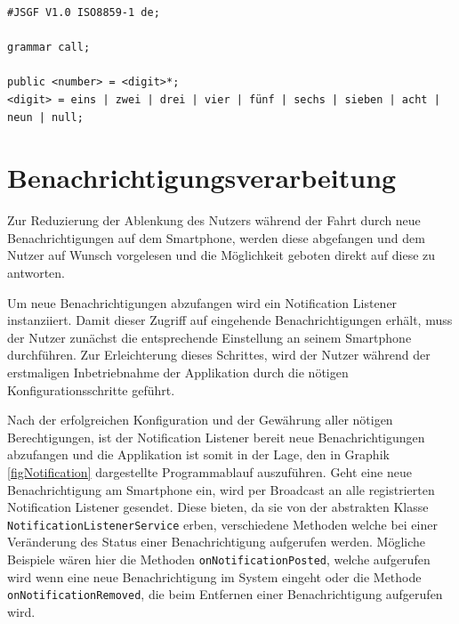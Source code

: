 \begin{lstlisting}[caption={Einfache Grammatik zur Erkennung von Telefonnummern},captionpos=b,label=lstGrammar]
#JSGF V1.0 ISO8859-1 de;

grammar call;

public <number> = <digit>*;
<digit> = eins | zwei | drei | vier | fünf | sechs | sieben | acht | neun | null;
\end{lstlisting}

\section{Benachrichtigungsverarbeitung}
Zur Reduzierung der Ablenkung des Nutzers während der Fahrt durch neue Benachrichtigungen auf dem Smartphone, werden diese abgefangen und dem Nutzer auf Wunsch vorgelesen und die Möglichkeit geboten direkt auf diese zu antworten.

Um neue Benachrichtigungen abzufangen wird ein Notification Listener instanziiert. Damit dieser Zugriff auf eingehende Benachrichtigungen erhält, muss der Nutzer zunächst die entsprechende Einstellung an seinem Smartphone durchführen. Zur Erleichterung dieses Schrittes, wird der Nutzer während der erstmaligen Inbetriebnahme der Applikation durch die nötigen Konfigurationsschritte geführt.

Nach der erfolgreichen Konfiguration und der Gewährung aller nötigen Berechtigungen, ist der Notification Listener bereit neue Benachrichtigungen abzufangen und die Applikation ist somit in der Lage, den in Graphik \ref{figNotification} dargestellte Programmablauf auszuführen. Geht eine neue Benachrichtigung am Smartphone ein, wird per Broadcast an alle registrierten Notification Listener gesendet. Diese bieten, da sie von der abstrakten Klasse \texttt{NotificationListenerService} erben, verschiedene Methoden welche bei einer Veränderung des Status einer Benachrichtigung aufgerufen werden. Mögliche Beispiele wären hier die Methoden \texttt{onNotificationPosted}, welche aufgerufen wird wenn eine neue Benachrichtigung im System eingeht oder die Methode \texttt{onNotificationRemoved}, die beim Entfernen einer Benachrichtigung aufgerufen wird.

